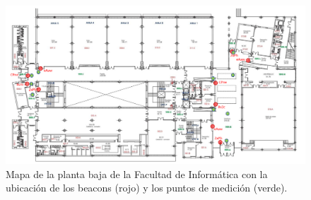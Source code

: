 \begin{figure}[t]

	\includegraphics[width=1\textwidth]{Imagenes/Descripciondeltrabajo/medidasPlanoPBaja}
	\caption{Mapa de la planta baja de la Facultad de Informática con la ubicación de los beacons (rojo) y los puntos de medición (verde). }
	\label{fig:medidasPBaja}
\end{figure}
